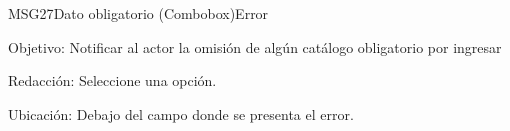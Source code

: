 \begin{mensaje}{MSG27}{Dato obligatorio (Combobox)}{Error}
	\item [Objetivo:] Notificar al actor la omisión de algún catálogo obligatorio por ingresar
	\item[Redacción:] Seleccione una opción.
	\item [Ubicación:] Debajo del campo donde se presenta el error.
\end{mensaje}